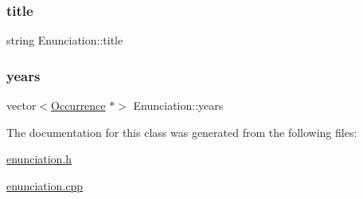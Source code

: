 \subsubsection{\texorpdfstring{title}{title}}
{\footnotesize\ttfamily string Enunciation\+::title\hspace{0.3cm}{\ttfamily [protected]}}

\mbox{\label{class_enunciation_a54cce81b8d17a0e2f06d651988507a4a}} 
\subsubsection{\texorpdfstring{years}{years}}
{\footnotesize\ttfamily vector$<$\hyperlink{class_occurrence}{Occurrence} $\ast$$>$ Enunciation\+::years\hspace{0.3cm}{\ttfamily [protected]}}



The documentation for this class was generated from the following files\+:\begin{DoxyCompactItemize}
\item 
\hyperlink{enunciation_8h}{enunciation.\+h}\item 
\hyperlink{enunciation_8cpp}{enunciation.\+cpp}\end{DoxyCompactItemize}
